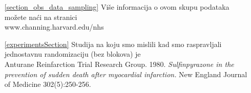 \begin{itemize}
	\item[\ref{section_obs_data_sampling}]
	Više informacija o ovom skupu podataka možete naći na stranici \\
	{www.channing.harvard.edu/nhs}

	\item[\ref{experimentsSection}]
	Studija na koju smo mislili kad smo raspravljali
	jednostavnu randomizaciju (bez blokova) je \\
	Anturane Reinfarction Trial Research Group. 1980.
	\emph{Sulfinpyrazone in the prevention of sudden
		death after myocardial infarction.}
	New England Journal of Medicine 302(5):250-256.
\end{itemize}
%
